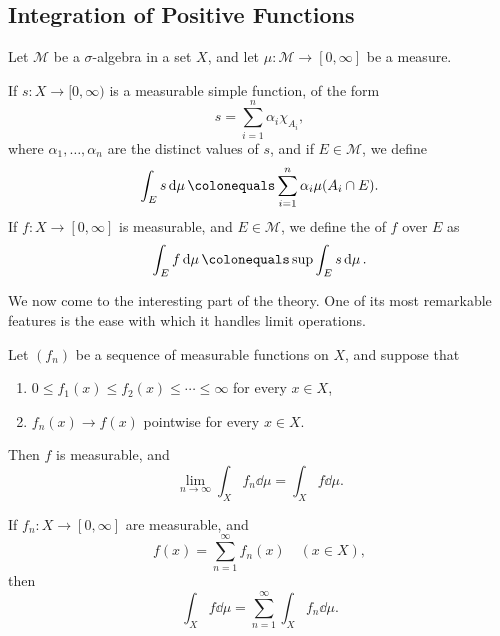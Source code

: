 \subsection{Integration of Positive Functions}
Let $\mathcal{M}$ be a $\sigma$-algebra in a set $X$, and let $\mu:\mathcal{M}\to[0,\infty]$ be a measure.

\begin{definition}
If $s:X\to[0,\infty)$ is a measurable simple function, of the form
\[s=\sum_{i=1}^{n}\alpha_i\chi_{A_i},\]
where $\alpha_1,\dots,\alpha_n$ are the distinct values of $s$, and if $E\in\mathcal{M}$, we define
\[\int_{E}s\dd{\mu}\colonequals\sum_{i=1}^{n}\alpha_i\mu(A_i\cap E).\]
If $f\colon X\to[0,\infty]$ is measurable, and $E\in\mathcal{M}$, we define the  of $f$ over $E$ as
\begin{equation}
\int_{E}f\dd{\mu}\colonequals\sup\int_{E}s\dd{\mu}.
\end{equation}
\end{definition}

\begin{lemma}

\end{lemma}

We now come to the interesting part of the theory. One of its most remarkable features is the ease with which it handles limit operations.

\begin{theorem}
Let $(f_n)$ be a sequence of measurable functions on $X$, and suppose that
\begin{enumerate}[label=(\roman*)]
\item $0\le f_1(x)\le f_2(x)\le\cdots\le\infty$ for every $x\in X$,
\item $f_n(x)\to f(x)$ pointwise for every $x\in X$.
\end{enumerate}
Then $f$ is measurable, and
\begin{equation}
\lim_{n\to\infty}\int_{X}f_n\dd{\mu}=\int_{X}f\dd{\mu}.
\end{equation}
\end{theorem}

\begin{proposition}
If $f_n:X\to[0,\infty]$ are measurable, and
\[f(x)=\sum_{n=1}^{\infty}f_n(x)\quad(x\in X),\]
then
\begin{equation}
\int_{X}f\dd{\mu}=\sum_{n=1}^{\infty}\int_{X}f_n\dd{\mu}.
\end{equation}
\end{proposition}

